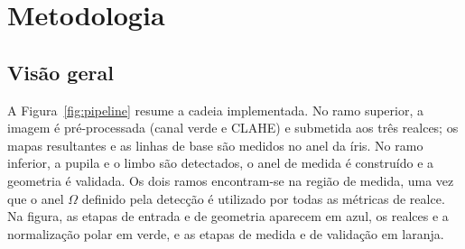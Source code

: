 \documentclass[12pt, oneside, a4paper, chapter=TITLE, section=TITLE,
               english, brazil]{abntex2}
\newcommand{\secao}[1]{\section[\texorpdfstring{\protect\MakeTextUppercase{#1}}{#1}]{#1}}
\begin{document}
\chapter{Metodologia}
\label{cap:metodologia}

\secao{Visão geral}

A Figura~\ref{fig:pipeline} resume a cadeia implementada. No ramo superior, a
imagem é pré-processada (canal verde e CLAHE) e submetida aos três realces;
os mapas resultantes e as linhas de base são medidos no anel da íris. No ramo
inferior, a pupila e o limbo são detectados, o anel de medida é construído e
a geometria é validada. Os dois ramos encontram-se na região de medida, uma
vez que o anel $\Omega$ definido pela detecção é utilizado por todas as
métricas de realce. Na figura, as etapas de entrada e de geometria aparecem em
azul, os realces e a normalização polar em verde, e as etapas de medida e de
validação em laranja.
\end{document}
